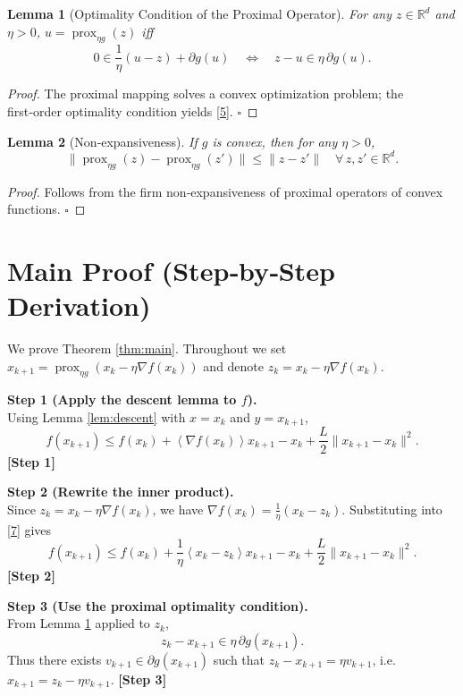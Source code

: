 \documentclass{article}
\newtheorem{lemma}{Lemma}
\newcommand{\prox}{\operatorname{prox}}
\newcommand{\grad}{\nabla}
\newcommand{\R}{\mathbb{R}}
\newcommand{\inner}[1]{\left\langle#1\right\rangle}
\begin{document}
\begin{lemma}[Optimality Condition of the Proximal Operator]\label{lem:prox-opt}
For any $z\in\R^{d}$ and $\eta>0$, $u=\prox_{\eta g}(z)$ iff
\[
0\in \frac{1}{\eta}(u-z)+\partial g(u)
\quad\Longleftrightarrow\quad
z-u\in \eta\,\partial g(u).
\tag{5}
\]
\end{lemma}
\begin{proof}
The proximal mapping solves a convex optimization problem; the first‑order optimality condition yields \eqref{5}. \hfill $\square$
\end{proof}

\begin{lemma}[Non‑expansiveness]\label{lem:nonexp}
If $g$ is convex, then for any $\eta>0$,
\[
\|\prox_{\eta g}(z)-\prox_{\eta g}(z')\|\le\|z-z'\|\quad\forall\,z,z'\in\R^{d}.
\tag{6}
\]
\end{lemma}
\begin{proof}
Follows from the firm non‑expansiveness of proximal operators of convex functions. \hfill $\square$
\end{proof}

\section*{Main Proof (Step‑by‑Step Derivation)}
We prove Theorem \ref{thm:main}. Throughout we set $x_{k+1}= \prox_{\eta g}(x_{k}-\eta\grad f(x_{k}))$ and denote $z_{k}=x_{k}-\eta\grad f(x_{k})$.

\noindent\textbf{Step 1 (Apply the descent lemma to $f$).}\\
Using Lemma \ref{lem:descent} with $x=x_{k}$ and $y=x_{k+1}$,
\[
f(x_{k+1})\le f(x_{k})+\inner{\grad f(x_{k})}{x_{k+1}-x_{k}}
+\frac{L}{2}\|x_{k+1}-x_{k}\|^{2}.
\tag{7}
\]
\textbf{[Step 1]}

\noindent\textbf{Step 2 (Rewrite the inner product).}\\
Since $z_{k}=x_{k}-\eta\grad f(x_{k})$, we have $\grad f(x_{k})=\frac{1}{\eta}(x_{k}-z_{k})$. Substituting into \eqref{7} gives
\[
f(x_{k+1})\le f(x_{k})+\frac{1}{\eta}\inner{x_{k}-z_{k}}{x_{k+1}-x_{k}}
+\frac{L}{2}\|x_{k+1}-x_{k}\|^{2}.
\tag{8}
\]
\textbf{[Step 2]}

\noindent\textbf{Step 3 (Use the proximal optimality condition).}\\
From Lemma \ref{lem:prox-opt} applied to $z_{k}$,
\[
z_{k}-x_{k+1}\in \eta\,\partial g(x_{k+1}) .
\tag{9}
\]
Thus there exists $v_{k+1}\in\partial g(x_{k+1})$ such that $z_{k}-x_{k+1}= \eta v_{k+1}$, i.e. $x_{k+1}=z_{k}-\eta v_{k+1}$.
\textbf{[Step 3]}
\end{document}

